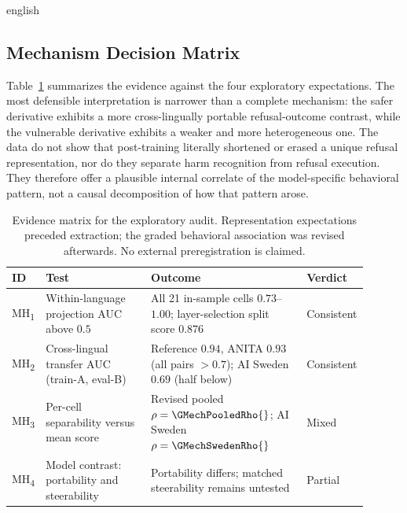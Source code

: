 \begin{otherlanguage*}{english}
\subsection{Mechanism Decision Matrix}
\label{sec:mechanism-decision-matrix}

Table~\ref{tab:mechanistic-decision-matrix} summarizes the evidence against the four exploratory expectations. The most defensible interpretation is narrower than a complete mechanism: the safer derivative exhibits a more cross-lingually portable refusal-outcome contrast, while the vulnerable derivative exhibits a weaker and more heterogeneous one. The data do not show that post-training literally shortened or erased a unique refusal representation, nor do they separate harm recognition from refusal execution. They therefore offer a plausible internal correlate of the model-specific behavioral pattern, not a causal decomposition of how that pattern arose.

\begin{table}[htbp]
\centering
\scriptsize
\caption[Evidence matrix for the refusal-direction audit]{Evidence matrix for the exploratory audit. Representation expectations preceded extraction; the graded behavioral association was revised afterwards. No external preregistration is claimed.}
\label{tab:mechanistic-decision-matrix}
\begin{tabular}{@{}p{0.06\linewidth}p{0.30\linewidth}p{0.44\linewidth}p{0.10\linewidth}@{}}
\toprule
ID & Test & Outcome & Verdict \\
\midrule
MH\textsubscript{1} & Within-language projection AUC above $0.5$ & All 21 in-sample cells $0.73$--$1.00$; layer-selection split score $0.876$ & Consistent \\
MH\textsubscript{2} & Cross-lingual transfer AUC (train-A, eval-B) & Reference $0.94$, ANITA $0.93$ (all pairs $>0.7$); AI Sweden $0.69$ (half below) & Consistent \\
MH\textsubscript{3} & Per-cell separability versus mean score & Revised pooled $\rho=\GMechPooledRho{}$; AI Sweden $\rho=\GMechSwedenRho{}$ & Mixed \\
MH\textsubscript{4} & Model contrast: portability and steerability & Portability differs; matched steerability remains untested & Partial \\
\bottomrule
\end{tabular}
\end{table}


\end{otherlanguage*}
